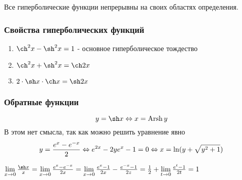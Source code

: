 Все гиперболические функции непрерывны на своих областях определения.

\subsubsection*{Свойства гиперболических функций}

\begin{enumerate}
	\item $\ch^2 x - \sh^2 x = 1$ - основное гиперболическое тождество
	\item $\ch^2 x + \sh^2 x = \ch 2x$
	\item $2 \cdot \sh x \cdot \ch x = \sh 2x$
\end{enumerate}

\subsubsection*{Обратные функции}

\[
	y = \sh x \lra x = \Arsh y
\]
В этом нет смысла, так как можно решить уравнение явно
\[
	y = \frac{e^x - e^{-x}}{2} \Leftrightarrow e^{2x} - 2ye^x - 1 = 0 \Leftrightarrow x = \ln (y + \sqrt{y^2 + 1})
\]

\begin{addition}
	$\liml_{x \to 0} \frac{\sh x}{x} = \liml_{x \to 0} \frac{e^x - e^{-x}}{2x} = \liml_{x \to 0} \frac{e^x - 1}{2x} - \frac{e^{-x} - 1}{2z} = \frac{1}{2} + \liml_{t \to 0} \frac{e^t - 1}{2t} = 1$
\end{addition}